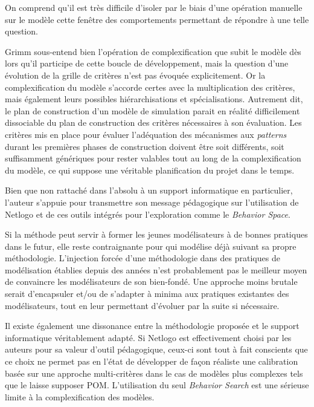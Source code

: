 On comprend qu'il est très difficile d'isoler par le biais d'une opération manuelle sur le modèle cette fenêtre des comportements permettant de répondre à une telle question. 

Grimm sous-entend bien l'opération de complexification que subit le modèle dès lors qu'il participe de cette boucle de développement, mais la question d'une évolution de la grille de critères n'est pas évoquée explicitement. Or la complexification du modèle s'accorde certes avec la multiplication des critères, mais également leurs possibles hiérarchisations et spécialisations. Autrement dit, le plan de construction d'un modèle de simulation parait en réalité difficilement dissociable du plan de construction des critères nécessaires à son évaluation. Les critères mis en place pour évaluer l'adéquation des mécanismes aux \textit{patterns} durant les premières phases de construction doivent être soit différents, soit suffisamment génériques pour rester valables tout au long de la complexification du modèle, ce qui suppose une véritable planification du projet dans le temps.

Bien que non rattaché dans l'absolu à un support informatique en particulier, l'auteur s'appuie pour transmettre son message pédagogique sur l'utilisation de Netlogo et de ces outils intégrés pour l'exploration comme le \textit{Behavior Space}.

Si la méthode peut servir à former les jeunes modélisateurs à de bonnes pratiques dans le futur, elle reste contraignante pour qui modélise déjà suivant sa propre méthodologie. L'injection forcée d'une méthodologie dans des pratiques de modélisation établies depuis des années n'est probablement pas le meilleur moyen de convaincre les modélisateurs de son bien-fondé. Une approche moins brutale serait d'encapsuler et/ou de s'adapter à minima aux pratiques existantes des modélisateurs, tout en leur permettant d'évoluer par la suite si nécessaire.

Il existe également une dissonance entre la méthodologie proposée et le support informatique véritablement adapté. Si Netlogo est effectivement choisi par les auteurs pour sa valeur d'outil pédagogique, ceux-ci sont tout à fait conscients \autocite[313-316]{Railsback2012}  que ce choix ne permet pas en l'état de développer de façon réaliste une calibration basée sur une approche multi-critères dans le cas de modèles plus complexes tels que le laisse supposer POM. L'utilisation du seul \textit{Behavior Search} est une sérieuse limite à la complexification des modèles. %

